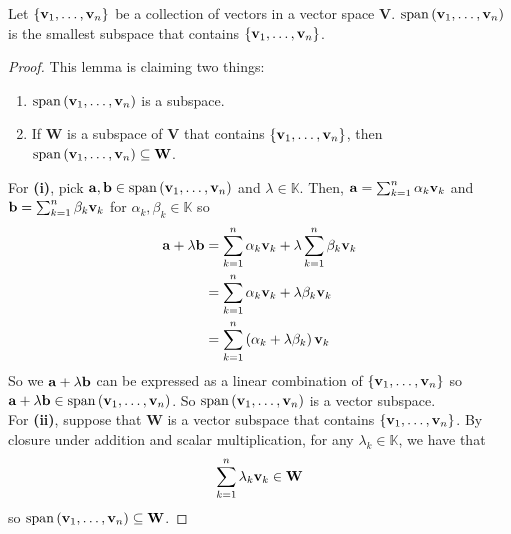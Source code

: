 \begin{lemma}
    Let \( \left\{ \vb{v}_{1}, \dots, \vb{v}_{n} \right\} \) be a collection of vectors in a vector space \( \mathbf{V} \). \( \mathrm{span} \left( \vb{v}_{1}, \dots, \vb{v}_{n}\right) \) is the smallest subspace that contains \( \left\{ \vb{v}_{1}, \dots, \vb{v}_{n} \right\} \).
\end{lemma}
\begin{proof}
    This lemma is claiming two things: 
    \begin{enumerate}[label=\textbf{\roman*)}]
        \item \( \mathrm{span} \left( \vb{v}_{1}, \dots, \vb{v}_{n} \right) \) is a subspace. 
        \item If \( \mathbf{W} \) is a subspace of \( \mathbf{V} \) that contains \( \left\{ \vb{v}_{1}, \dots, \vb{v}_{n} \right\} \), then \( \mathrm{span} \left( \vb{v}_{1}, \dots, \vb{v}_{n} \right) \subseteq \mathbf{W} \).
    \end{enumerate}
    For \textbf{(i)}, pick \( \vb{a}, \vb{b} \in \mathrm{span} \left( \vb{v}_{1}, \dots, \vb{v}_{n} \right) \) and \( \lambda \in \mathbb{K} \). Then, \( \vb{a} = \sum_{k=1}^{n} \alpha_{k} \vb{v}_{k} \) and \( \vb{b} = \sum_{k=1}^{n } \beta_{k} \vb{v}_{k} \) for \( \alpha_{k}, \beta_{k} \in \mathbb{K} \) so 
    \begin{align*}
        \vb{a} + \lambda \vb{b} &= \sum_{k=1}^{n} \alpha_{k} \vb{v}_{k} + \lambda \sum_{k=1}^{n } \beta_{k} \vb{v}_{k} \\
        &= \sum_{k=1}^{n } \alpha_{k} \vb{v}_{k} + \lambda \beta_{k} \vb{v}_{k} \\
        &= \sum_{k=1}^{n } \left( \alpha_{k} + \lambda \beta_{k} \right) \vb{v}_{k}
    \end{align*}
   So we \(  \vb{a} + \lambda \vb{b} \) can be expressed as a linear combination of \( \left\{ \vb{v}_{1}, \dots, \vb{v}_{n} \right\}  \) so \(  \vb{a} + \lambda \vb{b}  \in \mathrm{span} \left( \vb{v}_{1}, \dots, \vb{v}_{n} \right)\). So \(\mathrm{span} \left( \vb{v}_{1}, \dots, \vb{v}_{n} \right)   \) is a vector subspace. \\ 
   For \textbf{(ii)}, suppose that \( \mathbf{W} \) is a vector subspace that contains \(  \left\{ \vb{v}_{1}, \dots, \vb{v}_{n} \right\} \). By closure under addition and scalar multiplication, for any \( \lambda_{k} \in \mathbb{K} \), we have that 
   \[ \sum_{k=1}^{n } \lambda_{k} \vb{v}_{k} \in \mathbf{W} \]
   so \( \mathrm{span} \left( \vb{v}_{1}, \dots, \vb{v}_{n} \right) \subseteq \mathbf{W}  \).
\end{proof}


